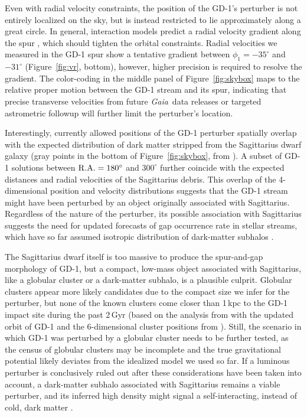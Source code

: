\documentclass[twocolumn]{aastex63}
\newcommand{\gaia}{\textsl{Gaia}}
\begin{document}
Even with radial velocity constraints, the position of the GD-1's perturber is not entirely localized on the sky, but is instead restricted to lie approximately along a great circle.
In general, interaction models predict a radial velocity gradient along the spur \citep{bonaca2019a}, which should tighten the orbital constraints.
Radial velocities we measured in the GD-1 spur show a tentative gradient between $\phi_1=-35^\circ$ and $-31^\circ$ (Figure~\ref{fig:vr}, bottom), however, higher precision is required to resolve the gradient.
The color-coding in the middle panel of Figure~\ref{fig:skybox} maps to the relative proper motion between the GD-1 stream and its spur, indicating that precise transverse velocities from future \gaia\ data releases or targeted astrometric followup will further limit the perturber's location.

Interestingly, currently allowed positions of the GD-1 perturber spatially overlap with the expected distribution of dark matter stripped from the Sagittarius dwarf galaxy (gray points in the bottom of Figure~\ref{fig:skybox}, from \citealt{dl2017}).
A subset of GD-1 solutions between $\rm R.A.=180^\circ$ and $300^\circ$ further coincide with the expected distances and radial velocities of the Sagittarius debris.
This overlap of the 4-dimensional position and velocity distributions suggests that the GD-1 stream might have been perturbed by an object originally associated with Sagittarius.
Regardless of the nature of the perturber, its possible association with Sagittarius suggests the need for updated forecasts of gap occurrence rate in stellar streams, which have so far assumed isotropic distribution of dark-matter subhalos \citep[e.g.,][]{erkal2016, banik2019}.

The Sagittarius dwarf itself is too massive to produce the spur-and-gap morphology of GD-1, but a compact, low-mass object associated with Sagittarius, like a globular cluster or a dark-matter subhalo, is a plausible culprit.
Globular clusters appear more likely candidates due to the compact size we infer for the perturber, but none of the known clusters come closer than 1\,kpc to the GD-1 impact site during the past 2\,Gyr (based on the analysis from \citealt{bonaca2019a} with the updated orbit of GD-1 and the 6-dimensional cluster positions from \citealt{baumgardt2019}).
Still, the scenario in which GD-1 was perturbed by a globular cluster needs to be further tested, as the census of globular clusters may be incomplete and the true gravitational potential likely deviates from the idealized model we used so far.
If a luminous perturber is conclusively ruled out after these considerations have been taken into account, a dark-matter subhalo associated with Sagittarius remains a viable perturber, and its inferred high density might signal a self-interacting, instead of cold, dark matter \citep[e.g.,][]{kahlhoefer2019}.
\end{document}
